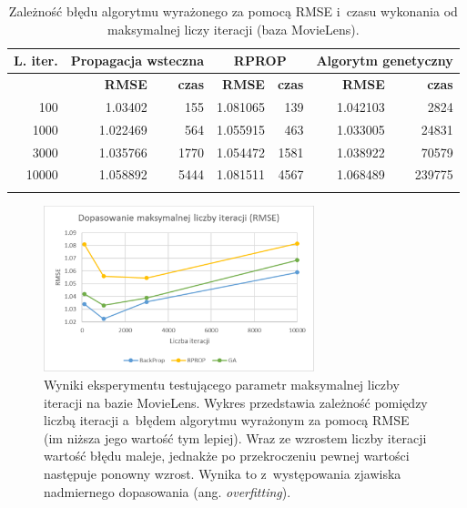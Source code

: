 \documentclass[twoside]{iisthesis}
\begin{document}
				\begin{longtable}[!ht]{r||rr|rr|rr}		
					\label{tab:expiterations}		
					\textbf{L. iter.} & \multicolumn{2}{c|}{\textbf{Propagacja wsteczna}}  & \multicolumn{2}{c|}{\textbf{RPROP}} & \multicolumn{2}{c}{\textbf{Algorytm genetyczny}}  \\
					\hline
					& \textbf{RMSE} & \textbf{czas} & \textbf{RMSE} & \textbf{czas} & \textbf{RMSE} & \textbf{czas} \\
					\hline
					100 & 1.03402 & 155 & 1.081065 & 139 & 1.042103 & 2824 \\
					1000  & 1.022469 & 564 & 1.055915 & 463 & 1.033005 & 24831  \\
					3000  & 1.035766 & 1770 & 1.054472 & 1581  & 1.038922 & 70579  \\
					10000 & 1.058892  & 5444 & 1.081511  & 4567  & 1.068489 & 239775 \\
					\caption{Zależność błędu algorytmu wyrażonego za pomocą RMSE i~czasu wykonania od maksymalnej liczy iteracji (baza MovieLens).}
				\end{longtable}
				
				\begin{figure}[!ht]
					\centering
					\includegraphics[width=0.7\textwidth]{expiterations_rmse}			
					\caption{Wyniki eksperymentu testującego parametr maksymalnej liczby iteracji na bazie MovieLens. Wykres przedstawia zależność pomiędzy liczbą iteracji a~błędem algorytmu wyrażonym za pomocą RMSE (im niższa jego wartość tym lepiej). Wraz ze wzrostem liczby iteracji wartość błędu maleje, jednakże po przekroczeniu pewnej wartości następuje ponowny wzrost. Wynika to z~występowania zjawiska nadmiernego dopasowania (ang. \textit{overfitting}). }
					\label{fig:expiterations_rmse}
				\end{figure}
			
\end{document}

